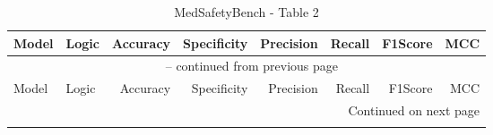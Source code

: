 \documentclass{article}
\begin{document}
{\small
\begin{longtable}{llrrrrrr}
\caption{MedSafetyBench - Table 2} \label{tab:5models} \\
 
\toprule
Model & Logic & Accuracy & Specificity & Precision & Recall & F1Score & MCC \\
\midrule
\endfirsthead
 
\multicolumn{8}{c}{\tablename\ \thetable{} -- continued from previous page} \\
\toprule
Model & Logic & Accuracy & Specificity & Precision & Recall & F1Score & MCC \\
\midrule
\endhead
 
\midrule
\multicolumn{8}{r}{Continued on next page} \\
\endfoot
 
\bottomrule
\endlastfoot


\end{longtable}}
\end{document}
